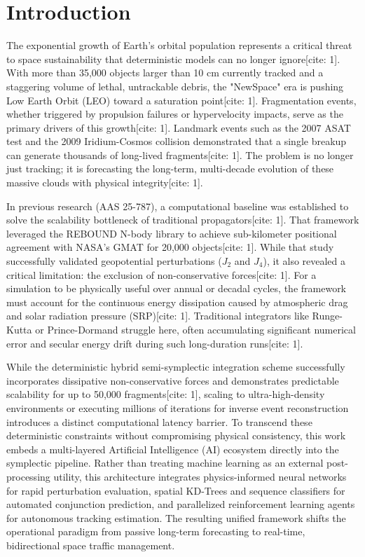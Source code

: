 \documentclass[conf]{AAS} %
\begin{document}
\section{Introduction}
\label{sec:introduction}

The exponential growth of Earth's orbital population represents a critical threat to space sustainability that deterministic models can no longer ignore[cite: 1]. With more than 35,000 objects larger than 10 cm currently tracked and a staggering volume of lethal, untrackable debris, the "NewSpace" era is pushing Low Earth Orbit (LEO) toward a saturation point[cite: 1]. Fragmentation events, whether triggered by propulsion failures or hypervelocity impacts, serve as the primary drivers of this growth[cite: 1]. Landmark events such as the 2007 ASAT test and the 2009 Iridium-Cosmos collision demonstrated that a single breakup can generate thousands of long-lived fragments[cite: 1]. The problem is no longer just tracking; it is forecasting the long-term, multi-decade evolution of these massive clouds with physical integrity[cite: 1].

In previous research (AAS 25-787), a computational baseline was established to solve the scalability bottleneck of traditional propagators[cite: 1]. That framework leveraged the REBOUND N-body library to achieve sub-kilometer positional agreement with NASA's GMAT for 20,000 objects[cite: 1]. While that study successfully validated geopotential perturbations ($J_2$ and $J_4$), it also revealed a critical limitation: the exclusion of non-conservative forces[cite: 1]. For a simulation to be physically useful over annual or decadal cycles, the framework must account for the continuous energy dissipation caused by atmospheric drag and solar radiation pressure (SRP)[cite: 1]. Traditional integrators like Runge-Kutta or Prince-Dormand struggle here, often accumulating significant numerical error and secular energy drift during such long-duration runs[cite: 1].

While the deterministic hybrid semi-symplectic integration scheme successfully incorporates dissipative non-conservative forces and demonstrates predictable scalability for up to 50,000 fragments[cite: 1], scaling to ultra-high-density environments or executing millions of iterations for inverse event reconstruction introduces a distinct computational latency barrier. To transcend these deterministic constraints without compromising physical consistency, this work embeds a multi-layered Artificial Intelligence (AI) ecosystem directly into the symplectic pipeline. Rather than treating machine learning as an external post-processing utility, this architecture integrates physics-informed neural networks for rapid perturbation evaluation, spatial KD-Trees and sequence classifiers for automated conjunction prediction, and parallelized reinforcement learning agents for autonomous tracking estimation. The resulting unified framework shifts the operational paradigm from passive long-term forecasting to real-time, bidirectional space traffic management.
\end{document}
